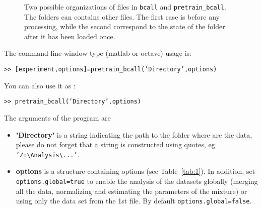 \documentclass{scrartcl}
\begin{document}
\begin{figure}
\begin{center}
\end{center}
\caption{Two possible organizations of files in \texttt{bcall} and
  \texttt{pretrain\_bcall}. The folders can contains other
  files. The first case is before any processing, while the second
  correspond to the state of the folder after it has been loaded once.}
\label{fig:1}
\end{figure}

The command line window type (matlab or octave) usage is:

\texttt{>> [experiment,options]=pretrain\_bcall('Directory',options)}

You can also use it as :

\texttt{>> pretrain\_bcall('Directory',options)}


The arguments of the program are 
\begin{itemize}
\item \textbf{'Directory'} is a string indicating the path to the folder
  where are the data, please do not forget that a string is
  constructed using quotes, eg
  \texttt{'Z:{\textbackslash}Analysis{\textbackslash}...'}.
\item \textbf{options} is a structure containing options (see
  Table~\ref{tab:1}). In addition, set \texttt{options.global=true} to
  enable the analysis of the datasets globally (merging all the data,
  normalizing and estimating the parameters of the mixture) or using
  only the data set from the 1st file. By default
  \texttt{options.global=false}.
\end{itemize}
\end{document}
